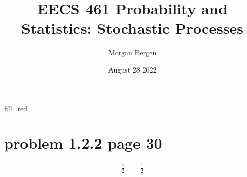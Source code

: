 \documentclass[10pt]{article}
\title{EECS 461 Probability and Statistics: Stochastic Processes}
\author{Morgan Bergen}
\date{August 28 2022}
\begin{document}
fill=red
\maketitle
\section{problem 1.2.2 page 30}

\begin{align}
\frac{1}{2} &= \frac{1}{2} \label{eq:1}

\end{align}
    
\end{document}
